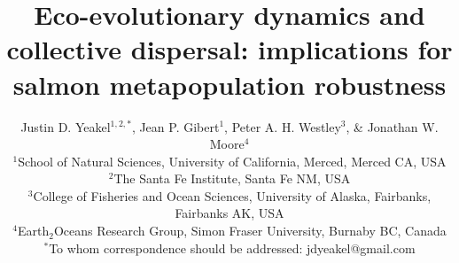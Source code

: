 \documentclass{revtex4}
\begin{document}
\title{Eco-evolutionary dynamics and collective dispersal: implications for salmon metapopulation robustness}
\author{
Justin D. Yeakel${}^{1,2,*}$, Jean P. Gibert${}^{1}$, Peter A. H. Westley${}^{3}$, \& Jonathan W. Moore${}^{4}$ \\
${}^1$School of Natural Sciences, University of California, Merced, Merced CA, USA \\
${}^2$The Santa Fe Institute, Santa Fe NM, USA \\
${}^3$College of Fisheries and Ocean Sciences, University of Alaska, Fairbanks, Fairbanks AK, USA \\
${}^4$Earth${}_2$Oceans Research Group, Simon Fraser University, Burnaby BC, Canada \\
${}^*$To whom correspondence should be addressed: jdyeakel@gmail.com
}
\end{document}
